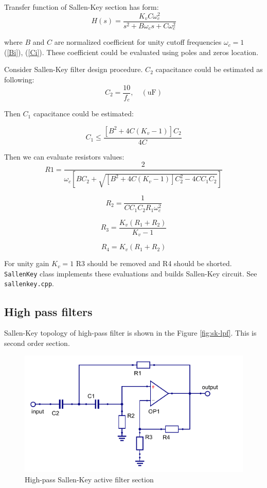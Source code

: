 Transfer function of Sallen-Key section has form:
\begin{equation}
 H(s)=\frac{K_v C\omega_c^2}{s^2+B\omega_cs+C\omega_c^2} \label{sk-lpf-trfunc}
\end{equation}

where $B$ and $C$ are normalized coefficient for unity cutoff frequencies
$\omega_c=1$ (\ref{Bi}), (\ref{Ci}). These coefficient could be evaluated using
poles and zeros location.

Consider Sallen-Key filter design procedure. $C_2$ capacitance could be
estimated as following:
\begin{equation}
 C_2=\frac{10}{f_c},  \quad (\mbox{uF}) \label{lp-C2}
\end{equation}

Then $C_1$ capacitance could be estimated:

\begin{equation}
 C_1\leq \frac{[B^2+4C(K_v-1)]C_2}{4C}
\end{equation}

Then we can evaluate resistors values:
\begin{equation}
 R1 = \frac{2}{\omega_c[BC_2+\sqrt{[B^2+4C(K_v-1)]C^2_2-4CC_1C_2}]}
\end{equation}

\begin{equation}
 R_2=\frac{1}{CC_1C_2R_1\omega_c^2}
\end{equation}

\begin{equation}
 R_3=\frac{K_v(R_1+R_2)}{K_v-1}
\end{equation}

\begin{equation}
 R_4=K_v(R_1+R_2)
\end{equation}

For unity gain $K_v=1$ R3 should be removed and R4 should be shorted.
\verb|SallenKey| class implements these evaluations and builds Sallen-Key
circuit. See \verb|sallenkey.cpp|.


\subsection{High pass filters}

Sallen-Key topology of high-pass filter is shown in the Figure
\ref{fig:sk-lpf}. This is second order section.

\begin{figure}[!ht]
  \centering
  \includegraphics[width=0.6\linewidth]{pics/sk-hpf}
  \caption{High-pass Sallen-Key active filter section}
  \label{fig:sk-hpf}
\end{figure}

